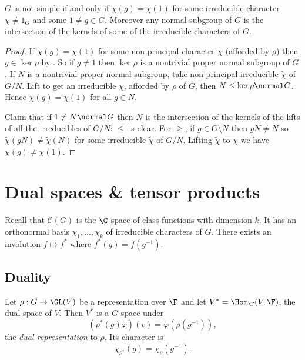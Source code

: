 \documentclass[a4paper]{article}
\theoremstyle{definition}
\begin{document}
\begin{lemma}
  \(G\) is not simple if and only if \(\chi(g) = \chi(1)\) for some irreducible character \(\chi \neq 1_G\) and some \(1 \neq g \in G\). Moreover any normal subgroup of \(G\) is the intersection of the kernels of some of the irreducible characters of \(G\).
\end{lemma}

\begin{proof}
  If \(\chi(g) = \chi(1)\) for some non-principal character \(\chi\) (afforded by \(\rho\)) then \(g \in \ker \rho\) by . So if \(g \neq 1\) then \(\ker \rho\) is a nontrivial proper normal subgroup of \(G\). If \(N\) is a nontrivial proper normal subgroup, take non-principal irreducible \(\tilde \chi\) of \(G/N\). Lift to get an irreducible \(\chi\), afforded by \(\rho\) of \(G\), then \(N \leq \ker \rho \normal G\). Hence \(\chi(g) = \chi(1)\) for all \(g \in N\).

  Claim that if \(1 \neq N \normal G\) then \(N\) is the intersection of the kernels of the lifts of all the irreducibles of \(G/N\): \(\leq\) is clear. For \(\geq\), if \(g \in G \setminus N\) then \(gN \neq N\) so \(\tilde \chi(gN) \neq \tilde \chi(N)\) for some irreducible \(\tilde \chi\) of \(G/N\). Lifting \(\tilde \chi\) to \(\chi\) we have \(\chi(g) \neq \chi(1)\).
\end{proof}

\section{Dual spaces \& tensor products}

Recall that \(\mathcal C(G)\) is the \(\C\)-space of class functions with dimension \(k\). It has an orthonormal basis \(\chi_1, \dots, \chi_k\) of irreducible characters of \(G\). There exists an involution \(f \mapsto f^*\) where \(f^*(g) = f(g^{-1})\).

\subsection{Duality}

\begin{lemma}
  Let \(\rho: G \to \GL(V)\) be a representation over \(\F\) and let \(V^* = \Hom_\F(V, \F)\), the dual space of \(V\). Then \(V^*\) is a \(G\)-space under
  \[
    (\rho^*(g)\varphi)(v) = \varphi(\rho(g^{-1})),
  \]
  the \emph{dual representation} to \(\rho\). Its character is
  \[
    \chi_{\rho^*}(g) = \chi_\rho(g^{-1}).
  \]
\end{lemma}
\end{document}
